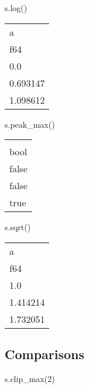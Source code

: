 \documentclass[
  letterpaper,
  DIV=11,
  numbers=noendperiod]{scrartcl}
\newenvironment{Shaded}{\begin{snugshade}}{\end{snugshade}}
\newcommand{\DecValTok}[1]{\textcolor[rgb]{0.68,0.00,0.00}{#1}}
\newcommand{\NormalTok}[1]{\textcolor[rgb]{0.00,0.23,0.31}{#1}}
\begin{document}
\begin{Shaded}
\begin{Highlighting}[]
\NormalTok{s.log()}
\end{Highlighting}
\end{Shaded}

\begin{longtable}[]{@{}l@{}}
\toprule()
a \\
f64 \\
\midrule()
\endhead
0.0 \\
0.693147 \\
1.098612 \\
\bottomrule()
\end{longtable}

\begin{Shaded}
\begin{Highlighting}[]
\NormalTok{s.peak\_max()}
\end{Highlighting}
\end{Shaded}

\begin{longtable}[]{@{}l@{}}
\toprule()
 \\
bool \\
\midrule()
\endhead
false \\
false \\
true \\
\bottomrule()
\end{longtable}

\begin{Shaded}
\begin{Highlighting}[]
\NormalTok{s.sqrt()}
\end{Highlighting}
\end{Shaded}

\begin{longtable}[]{@{}l@{}}
\toprule()
a \\
f64 \\
\midrule()
\endhead
1.0 \\
1.414214 \\
1.732051 \\
\bottomrule()
\end{longtable}

\hypertarget{comparisons}{%
\subsection{Comparisons}\label{comparisons}}

\begin{Shaded}
\begin{Highlighting}[]
\NormalTok{s.clip\_max(}\DecValTok{2}\NormalTok{)}
\end{Highlighting}
\end{Shaded}
\end{document}
